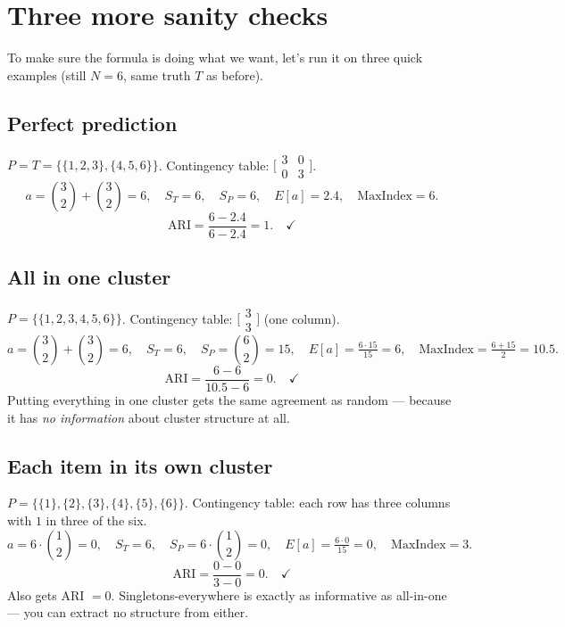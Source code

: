 \documentclass[11pt]{article}
\begin{document}
\section{Three more sanity checks}

To make sure the formula is doing what we want, let's run it on three
quick examples (still $N = 6$, same truth $T$ as before).

\subsection{Perfect prediction}
$P = T = \{\{1,2,3\}, \{4,5,6\}\}$. Contingency table:
$\bigl[\begin{smallmatrix} 3 & 0 \\ 0 & 3 \end{smallmatrix}\bigr]$.
\[
  a = \binom{3}{2} + \binom{3}{2} = 6, \quad
  S_T = 6, \quad S_P = 6, \quad E[a] = 2.4, \quad \mathrm{MaxIndex} = 6.
\]
\[
  \text{ARI} = \frac{6 - 2.4}{6 - 2.4} = 1. \quad\checkmark
\]

\subsection{All in one cluster}
$P = \{\{1, 2, 3, 4, 5, 6\}\}$. Contingency table:
$\bigl[\begin{smallmatrix} 3 \\ 3 \end{smallmatrix}\bigr]$ (one column).
\[
  a = \binom{3}{2} + \binom{3}{2} = 6, \quad
  S_T = 6, \quad S_P = \binom{6}{2} = 15, \quad
  E[a] = \tfrac{6 \cdot 15}{15} = 6, \quad \mathrm{MaxIndex} = \tfrac{6+15}{2} = 10.5.
\]
\[
  \text{ARI} = \frac{6 - 6}{10.5 - 6} = 0. \quad\checkmark
\]
Putting everything in one cluster gets the same agreement as random ---
because it has \emph{no information} about cluster structure at all.

\subsection{Each item in its own cluster}
$P = \{\{1\}, \{2\}, \{3\}, \{4\}, \{5\}, \{6\}\}$. Contingency table:
each row has three columns with $1$ in three of the six.
\[
  a = 6 \cdot \binom{1}{2} = 0, \quad
  S_T = 6, \quad S_P = 6 \cdot \binom{1}{2} = 0, \quad
  E[a] = \tfrac{6 \cdot 0}{15} = 0, \quad \mathrm{MaxIndex} = 3.
\]
\[
  \text{ARI} = \frac{0 - 0}{3 - 0} = 0. \quad\checkmark
\]
Also gets ARI $= 0$. Singletons-everywhere is exactly as informative as
all-in-one --- you can extract no structure from either.
\end{document}

